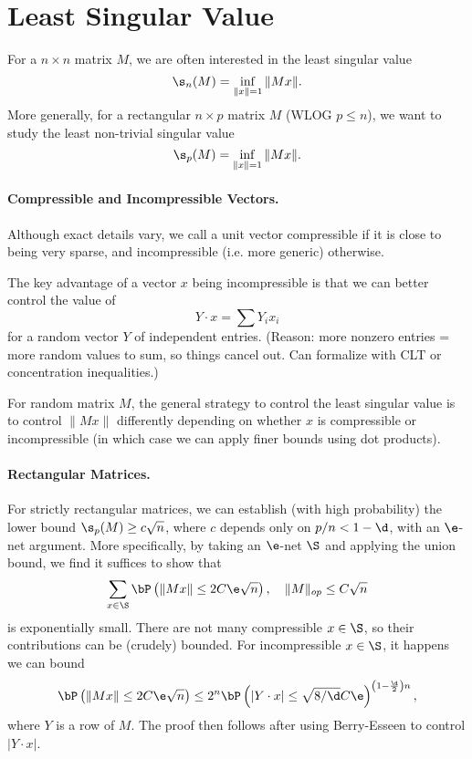 \section{Least Singular Value}

For a $n \times n$ matrix $M$, we are often interested in the least singular value
\[
    \s_n(M) = \inf_{\|x\| = 1}\|Mx\|.
\]
More generally, for a rectangular $n \times p$ matrix $M$ (WLOG $p \le n$), we want to study the least non-trivial singular value
\[
    \s_p(M) = \inf_{\|x\| = 1}\|Mx\|.
\]

\paragraph{Compressible and Incompressible Vectors.} Although exact details vary, we call a unit vector compressible if it is close to being very sparse, and incompressible (i.e. more generic) otherwise.

The key advantage of a vector $x$ being incompressible is that we can better control the value of
\[
    Y \cdot x = \sum Y_ix_i
\]
for a random vector $Y$ of independent entries. (Reason: more nonzero entries = more random values to sum, so things cancel out. Can formalize with CLT or concentration inequalities.)

For random matrix $M$, the general strategy to control the least singular value is to control $\|Mx\|$ differently depending on whether $x$ is compressible or incompressible (in which case we can apply finer bounds using dot products).

\paragraph{Rectangular Matrices.} For strictly rectangular matrices, we can establish (with high probability) the lower bound $\s_p(M) \ge c \sqrt{n}$, where $c$ depends only on $p/n < 1 - \d$, with an $\e$-net argument. More specifically, by taking an $\e$-net $\S$ and applying the union bound, we find it suffices to show that
\[
    \sum_{x \in \S} \bP\left( \|Mx\| \le 2C\e\sqrt{n} \right), \quad \|M\|_{op} \le C\sqrt{n}
\]
is exponentially small. There are not many compressible $x \in \S$, so their contributions can be (crudely) bounded. For incompressible $x \in \S$, it happens we can bound
\[
    \bP\left( \|Mx\| \le 2C\e\sqrt{n} \right) \le 2^n \bP\left( |Y \cdot x| \le \sqrt{8/\d}C\e \right)^{\left( 1 - \frac{\d}{2} \right)n},
\]
where $Y$ is a row of $M$. The proof then follows after using Berry-Esseen to control $|Y \cdot x|$.

